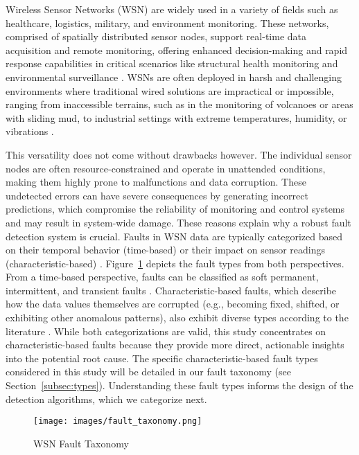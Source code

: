 Wireless Sensor Networks (WSN) are widely used in a variety of fields such as healthcare, logistics, military, and environment monitoring. These networks, comprised of spatially distributed sensor nodes, support real-time data acquisition and remote monitoring, offering enhanced decision-making and rapid response capabilities in critical scenarios like structural health monitoring and environmental surveillance \cite{Yick2008, Chai2020, Ullo2020}. WSNs are often deployed in harsh and challenging environments where traditional wired solutions are impractical or impossible, ranging from inaccessible terrains, such as in the monitoring of volcanoes or areas with sliding mud, to industrial settings with extreme temperatures, humidity, or vibrations \cite{Gungor2009, Prasad2023}.

This versatility does not come without drawbacks however. The individual sensor nodes are often resource-constrained and operate in unattended conditions, making them highly prone to malfunctions and data corruption. These undetected errors can have severe consequences by generating incorrect predictions, which compromise the reliability of monitoring and control systems and may result in system-wide damage. These reasons explain why a robust fault detection system is crucial. Faults in WSN data are typically categorized based on their temporal behavior (time-based) or their impact on sensor readings (characteristic-based) \cite{Baljak2013, Adday2022}. Figure~\ref{fig:types} depicts the fault types from both perspectives. From a time-based perspective, faults can be classified as soft permanent, intermittent, and transient faults \cite{Prasad2023}. Characteristic-based faults, which describe how the data values themselves are corrupted (e.g., becoming fixed, shifted, or exhibiting other anomalous patterns), also exhibit diverse types according to the literature \cite{Shi2024, Saeed2021, Ni2009, Hasan2024}. While both categorizations are valid, this study concentrates on characteristic-based faults because they provide more direct, actionable insights into the potential root cause. The specific characteristic-based fault types considered in this study will be detailed in our fault taxonomy (see Section~\ref{subsec:types}). Understanding these fault types informs the design of the detection algorithms, which we categorize next.

\begin{figure}
  \centering
  \texttt{[image: images/fault\_taxonomy.png]}
  \caption{WSN Fault Taxonomy}
  \label{fig:types}
\end{figure}

